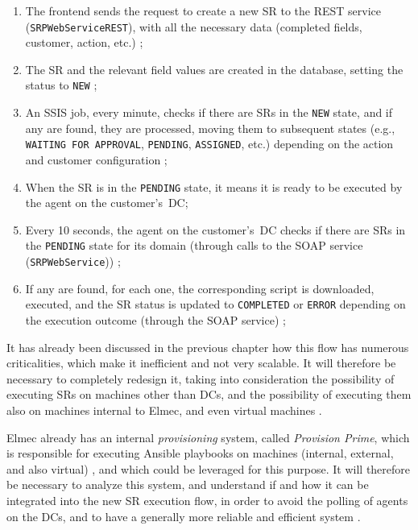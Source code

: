 \begin{enumerate}
 \item The frontend sends the request to create a new SR to the REST service (\texttt{SRPWebServiceREST}), with all the necessary data (completed fields, customer, action, etc.) \cite{srp_webservicerest_git};
 \item The SR and the relevant field values are created in the database, setting the status to \texttt{NEW} \cite{srp_webservicerest_git};
 \item An SSIS job, every minute, checks if there are SRs in the \texttt{NEW} state, and if any are found, they are processed, moving them to subsequent states (e.g., \texttt{WAITING FOR APPROVAL}, \texttt{PENDING}, \texttt{ASSIGNED}, etc.) depending on the action and customer configuration \cite{service_request_portal};
 \item When the SR is in the \texttt{PENDING} state, it means it is ready to be executed by the agent on the customer's~DC;
 \item Every 10 seconds, the agent on the customer's~DC checks if there are SRs in the \texttt{PENDING} state for its domain (through calls to the SOAP service (\texttt{SRPWebService})) \cite{srp_windowsservice_git};
 \item If any are found, for each one, the corresponding script is downloaded, executed, and the SR status is updated to \texttt{COMPLETED} or \texttt{ERROR} depending on the execution outcome (through the SOAP service) \cite{srp_windowsservice_git};
\end{enumerate}

It has already been discussed in the previous chapter how this flow has numerous criticalities, which make it inefficient and not very scalable.
It will therefore be necessary to completely redesign it, taking into consideration the possibility of executing SRs on machines other than DCs, and the possibility of executing them also on machines internal to Elmec, and even virtual machines \cite{requirements_meeting}.

Elmec already has an internal \textit{provisioning} system, called \textit{Provision Prime}, which is responsible for executing Ansible playbooks on machines (internal, external, and also virtual) \cite{provision_prime_git}, and which could be leveraged for this purpose. It will therefore be necessary to analyze this system, and understand if and how it can be integrated into the new SR execution flow, in order to avoid the polling of agents on the DCs, and to have a generally more reliable and efficient system \cite{requirements_meeting}.

